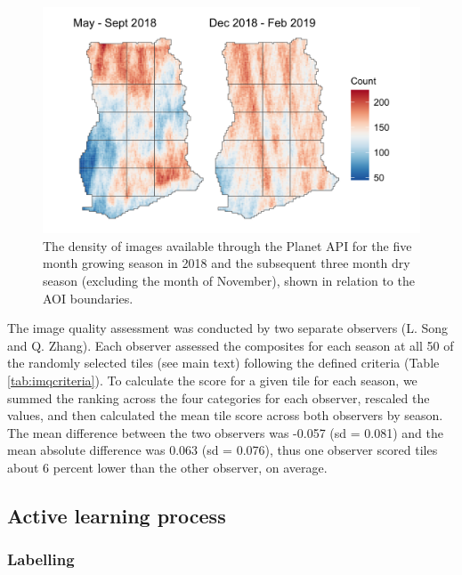 \documentclass[
  11pt,
  a4paper]{article}
\begin{document}
\begin{figure}[!ht]

{\centering \includegraphics[width=0.9\linewidth,]{figures/si_planet_coverage} 

}

\caption{The density of images available through the Planet API for the five month growing season in 2018 and the subsequent three month dry season (excluding the month of November), shown in relation to the AOI boundaries.}\label{fig:imagedensity}
\end{figure}

The image quality assessment was conducted by two separate observers (L.
Song and Q. Zhang). Each observer assessed the composites for each
season at all 50 of the randomly selected tiles (see main text)
following the defined criteria (Table \ref{tab:imqcriteria}). To
calculate the score for a given tile for each season, we summed the
ranking across the four categories for each observer, rescaled the
values, and then calculated the mean tile score across both observers by
season. The mean difference between the two observers was -0.057 (sd =
0.081) and the mean absolute difference was 0.063 (sd = 0.076), thus one
observer scored tiles about 6 percent lower than the other observer, on
average.

\hypertarget{active-learning-process}{%
\subsection{Active learning process}\label{active-learning-process}}

\hypertarget{labelling}{%
\subsubsection{Labelling}\label{labelling}}
\end{document}
